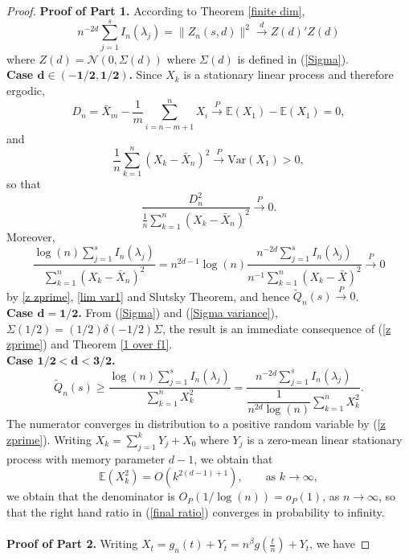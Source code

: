 \documentclass[12pt]{article}
\numberwithin{equation}{section}
\begin{document}
\begin{proof}
{\bf Proof of Part 1.}
According to Theorem \ref{finite dim},
\begin{equation}\label{z zprime}
n^{-2d}\sum_{j=1}^sI_n(\lambda_j)=\|Z_n(s,d)\|^2\overset{d}{\longrightarrow}Z(d)'Z(d)
\end{equation}
where $Z(d)=\mathcal{N}\left(0,\Sigma(d)\right)$ where $\Sigma(d)$ is defined in (\ref{Sigma}). \\
{\bf Case  $\mathbf{d\in(-1/2,1/2)}$.}  Since $X_k$ is a stationary linear process and therefore ergodic, 
$$
D_n=\bar X_m-\frac{1}{m}\sum_{i=n-m+1}^nX_i\overset{P}{\to}\mathbb{E}(X_1)-\mathbb{E}(X_1)=0,
$$
and
$$\frac{1}{n}\sum_{k=1}^n(X_k-\bar X_n)^2\overset{P}{\to}\textrm{Var}(X_1)>0,
$$
so that
\begin{equation}\label{lim var1}
\frac{D_n^2}{\frac{1}{n}\displaystyle\sum_{k=1}^n(X_k-\bar X_n)^2}\overset{P}{\to}0.
\end{equation}
Moreover,
$$
\frac{\log (n)\displaystyle\sum_{j=1}^sI_n(\lambda_j)}{\displaystyle\sum_{k=1}^n(X_k-\bar X_n)^2}=n^{2d-1}\log(n)\frac{n^{-2d}\displaystyle\sum_{j=1}^sI_n(\lambda_j)}{n^{-1}\displaystyle\sum_{k=1}^n(X_k-\bar X)^2}\overset{P}{\to}0
$$
by \eqref{z zprime}, \eqref{lim var1} and Slutsky Theorem, and hence $\tilde Q_n(s)\overset{P}{\to}0$.\\
{\bf Case  $\mathbf{d=1/2}$.} From (\ref{Sigma}) and  (\ref{Sigma variance}), $\Sigma(1/2)=(1/2)\delta(-1/2)\Sigma$, the result is an immediate consequence of (\ref{z zprime}) and Theorem  \ref{1 over f1}.\\
{\bf Case $\mathbf{1/2<d<3/2}$.} 
\begin{equation}\label{final ratio}
\tilde Q_n(s)\ge\frac{\log (n)\displaystyle\sum_{j=1}^sI_n(\lambda_j)}{\displaystyle\sum_{k=1}^nX_k^2}=\frac{n^{-2d}\displaystyle\sum_{j=1}^sI_n(\lambda_j)}{\dfrac{1}{n^{2d}\log (n)}\displaystyle\sum_{k=1}^nX_k^2}.
\end{equation}
The numerator converges in distribution to a positive random variable by (\ref{z zprime}). Writing $X_k=\sum_{j=1}^kY_j+X_0$ where $Y_j$ is a zero-mean linear stationary process with memory parameter $d-1$, we obtain that
$$
\mathbb{E}(X_k^2)=O\left(k^{2(d-1)+1}\right),\qquad\textrm{as }k\to\infty,
$$
we obtain that the denominator is $O_P(1/\log(n))=o_P(1)$, as $n\to\infty$, so that the right hand ratio in (\ref{final ratio}) converges  in probability to infinity.\\\\
{\bf Proof of Part 2.}
Writing $X_t=g_n(t)+Y_t=n^\beta g\left(\frac{t}{n}\right)+Y_t$, we have

\end{proof}
\end{document}
